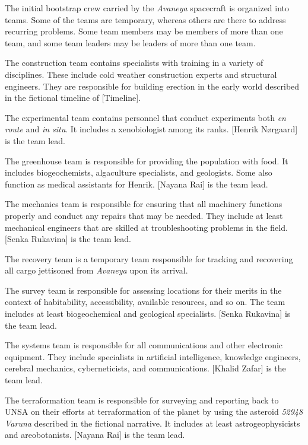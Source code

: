 

The initial bootstrap crew carried by the {\it Avaneya} spacecraft is organized into teams. Some of the teams are temporary, whereas others are there to address recurring problems. Some team members may be members of more than one team, and some team leaders may be leaders of more than one team.

The construction team contains specialists with training in a variety of disciplines. These include cold weather construction experts and structural engineers. They are responsible for building erection in the early world described in the fictional timeline of [Timeline].

The experimental team contains personnel that conduct experiments both {\it en route} and {\it in situ}. It includes a xenobiologist among its ranks. [Henrik Nørgaard] is the team lead.

The greenhouse team is responsible for providing the population with food. It includes biogeochemists, algaculture specialists, and geologists. Some also function as medical assistants for Henrik. [Nayana Rai] is the team lead.

The mechanics team is responsible for ensuring that all machinery functions properly and conduct any repairs that may be needed. They include at least mechanical engineers that are skilled at troubleshooting problems in the field. [Senka Rukavina] is the team lead.

The recovery team is a temporary team responsible for tracking and recovering all cargo jettisoned from {\it Avaneya} upon its arrival.

The survey team is responsible for assessing locations for their merits in the context of habitability, accessibility, available resources, and so on. The team includes at least biogeochemical and geological specialists. [Senka Rukavina] is the team lead.

The systems team is responsible for all communications and other electronic equipment. They include specialists in artificial intelligence, knowledge engineers, cerebral mechanics, cyberneticists, and communications. [Khalid Zafar] is the team lead.

The terraformation team is responsible for surveying and reporting back to UNSA on their efforts at terraformation of the planet by using the asteroid {\it 52948 Varuna} described in the fictional narrative. It includes at least astrogeophysicists and areobotanists. [Nayana Rai] is the team lead.

